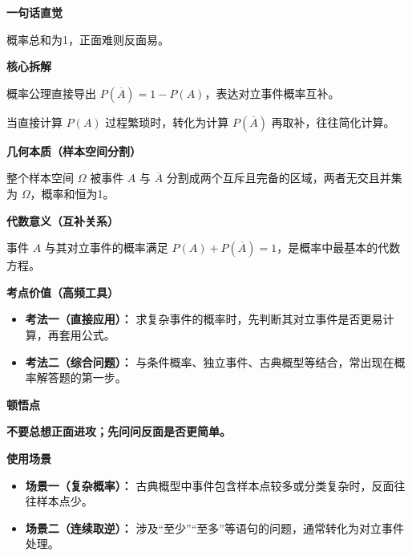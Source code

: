 \begin{explanationbox}
	\textbf{\textcolor{CExplanation}{一句话直觉}}

	概率总和为1，正面难则反面易。

	\medskip
	\textbf{\textcolor{CExplanation}{核心拆解}}
	\begin{description}[style=nextline, leftmargin=2.8em, labelsep=0.5em, itemsep=0.45em]
		\item[\textbf{要点一（公式结构）：}] 概率公理直接导出 $P(\overline{A}) = 1 - P(A)$，表达对立事件概率互补。
		\item[\textbf{要点二（正难则反）：}] 当直接计算 $P(A)$ 过程繁琐时，转化为计算 $P(\overline{A})$ 再取补，往往简化计算。
	\end{description}

	\medskip
	\textbf{\textcolor{CExplanation}{几何本质（样本空间分割）}}

	整个样本空间 $\Omega$ 被事件 $A$ 与 $\overline{A}$ 分割成两个互斥且完备的区域，两者无交且并集为 $\Omega$，概率和恒为1。

	\medskip
	\textbf{\textcolor{CExplanation}{代数意义（互补关系）}}

	事件 $A$ 与其对立事件的概率满足 $P(A) + P(\overline{A}) = 1$，是概率中最基本的代数方程。

	\medskip
	\textbf{\textcolor{CExplanation}{考点价值（高频工具）}}
	\begin{itemize}[leftmargin=*, itemsep=0.5em, topsep=0.4em]
		\item \textbf{考法一（直接应用）：} 求复杂事件的概率时，先判断其对立事件是否更易计算，再套用公式。
		\item \textbf{考法二（综合问题）：} 与条件概率、独立事件、古典概型等结合，常出现在概率解答题的第一步。
	\end{itemize}

	\medskip
	\textbf{\textcolor{CExplanation}{顿悟点}}

	\textbf{不要总想正面进攻；先问问反面是否更简单。}

	\medskip
	\textbf{\textcolor{CExplanation}{使用场景}}
	\begin{itemize}[leftmargin=*, itemsep=0.5em, topsep=0.4em]
		\item \textbf{场景一（复杂概率）：} 古典概型中事件包含样本点较多或分类复杂时，反面往往样本点少。
		\item \textbf{场景二（连续取逆）：} 涉及“至少”“至多”等语句的问题，通常转化为对立事件处理。
	\end{itemize}
\end{explanationbox}
